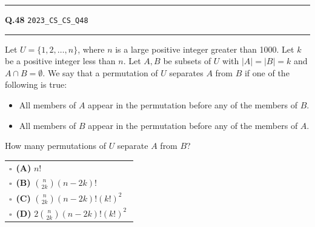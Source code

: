 \documentclass[a4paper,10pt]{article}
\begin{document}
\vspace{6pt}\hrule height 0.35pt\vspace{6pt}
\noindent
\begin{tcolorbox}[
    blanker,
    sidebyside,
    sidebyside align=top,
    lefthand width=0.55\textwidth,
    top=4pt, bottom=4pt, left=0pt, right=0pt,
    middle=16pt,
    underlay={
        \draw[dashed, black!80, line width=0.8pt, dash pattern=on 4pt off 3pt]
            ([xshift=0.55\textwidth+8pt]frame.north west) --
            ([xshift=0.55\textwidth+8pt]frame.south west);
    }
]
\textbf{Q.48}  \hfill {\tiny\texttt{2023\_CS\_CS\_Q48}}
\vspace{2pt}\hrule height 0.3pt\vspace{4pt}

Let $U = \{1, 2, \dots, n\}$, where $n$ is a large positive integer greater than 1000. Let $k$ be a positive integer less than $n$. Let $A, B$ be subsets of $U$ with $|A| = |B| = k$ and $A \cap B = \emptyset$. We say that a permutation of $U$ separates $A$ from $B$ if one of the following is true:
\begin{itemize}[itemsep=0pt,topsep=2pt]
\item All members of $A$ appear in the permutation before any of the members of $B$.
\item All members of $B$ appear in the permutation before any of the members of $A$.
\end{itemize}
How many permutations of $U$ separate $A$ from $B$?

\par\vspace{6pt}\noindent
\begin{tabular}{@{}p{0.98\linewidth}@{}}
$\square$\ \textbf{(A)} $n!$ \\
\addlinespace[3pt]
$\square$\ \textbf{(B)} $\binom{n}{2k} (n - 2k)!$ \\
\addlinespace[3pt]
$\square$\ \textbf{(C)} $\binom{n}{2k} (n - 2k)! (k!)^2$ \\
\addlinespace[3pt]
$\square$\ \textbf{(D)} $2 \binom{n}{2k} (n - 2k)! (k!)^2$
\end{tabular}

\tcblower


\end{tcolorbox}
\end{document}
